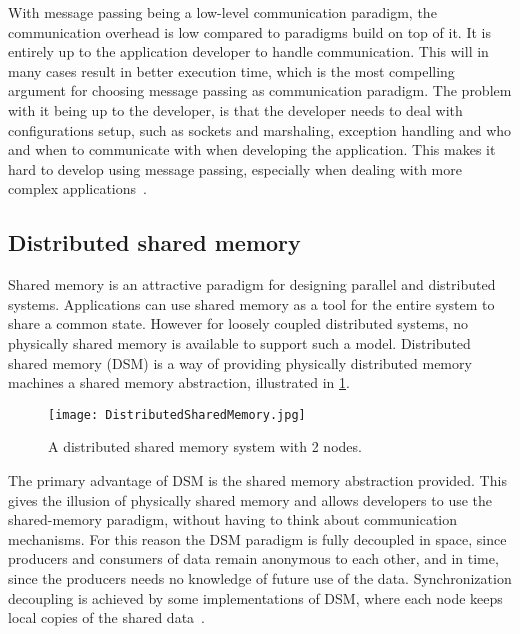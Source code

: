 With message passing being a low-level communication paradigm, the communication overhead is low compared to paradigms build on top of it. It is entirely up to the application developer to handle communication. This will in many cases result in better execution time, which is the most compelling argument for choosing message passing as communication paradigm. The problem with it being up to the developer, is that the developer needs to deal with configurations setup, such as sockets and marshaling, exception handling and who and when to communicate with when developing the application. This makes it hard to develop using message passing, especially when dealing with more complex applications~\cite{lu1995message}. 


\subsection{Distributed shared memory}\label{sec:DSM}

Shared memory is an attractive paradigm for designing parallel and distributed systems. Applications can use shared memory as a tool for the entire system to share a common state. However for loosely coupled distributed systems, no physically shared memory is available to support such a model. Distributed shared memory (DSM) is a way of providing physically distributed memory machines a shared memory abstraction, illustrated in \cref{fig:distributedSharedMemory}.

\begin{figure}
	\centering
	\texttt{[image: DistributedSharedMemory.jpg]} 
	\caption[Distributed Computing System with 2 nodes]{
		\label{fig:distributedSharedMemory} 
		\footnotesize{%
			A distributed shared memory system with 2 nodes.
		}
	}
\end{figure}

The primary advantage of DSM is the shared memory abstraction provided. This gives the illusion of physically shared memory and allows developers to use the shared-memory paradigm, without having to think about communication mechanisms. For this reason the DSM paradigm is fully decoupled in space, since producers and consumers of data remain anonymous to each other, and in time, since the producers needs no knowledge of future use of the data. Synchronization decoupling is achieved by some implementations of DSM, where each node keeps local copies of the shared data~\cite{guedes1993distributed}.

